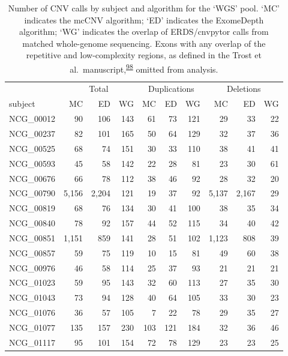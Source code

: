 \documentclass[11pt,letterpaper]{book}
\begin{document}
\begin{table}

\caption[Number of CNV calls by subject and algorithm for the 'WGS' pool.]{\label{tab:wgsCallSbj}Number of CNV calls by subject and algorithm for the `WGS' pool. `MC' indicates the mcCNV algorithm; `ED' indicates the ExomeDepth algorithm; `WG' indicates the overlap of ERDS/cnvpytor calls from matched whole-genome sequencing. Exons with any overlap of the repetitive and low-complexity regions, as defined in the Trost et al.~manuscript,\textsuperscript{\protect\hyperlink{ref-trost:2018aa}{98}} omitted from analysis.}
\centering
\begin{tabular}[t]{lrrrrrrrrr}
\toprule
\multicolumn{1}{c}{ } & \multicolumn{3}{c}{Total} & \multicolumn{3}{c}{Duplications} & \multicolumn{3}{c}{Deletions} \\
\cmidrule(l{3pt}r{3pt}){2-4} \cmidrule(l{3pt}r{3pt}){5-7} \cmidrule(l{3pt}r{3pt}){8-10}
subject & MC & ED & WG & MC & ED & WG & MC & ED & WG\\
\midrule
NCG\_00012 & 90 & 106 & 143 & 61 & 73 & 121 & 29 & 33 & 22\\
NCG\_00237 & 82 & 101 & 165 & 50 & 64 & 129 & 32 & 37 & 36\\
NCG\_00525 & 68 & 74 & 151 & 30 & 33 & 110 & 38 & 41 & 41\\
NCG\_00593 & 45 & 58 & 142 & 22 & 28 & 81 & 23 & 30 & 61\\
NCG\_00676 & 66 & 78 & 112 & 38 & 46 & 92 & 28 & 32 & 20\\
\addlinespace
NCG\_00790 & 5,156 & 2,204 & 121 & 19 & 37 & 92 & 5,137 & 2,167 & 29\\
NCG\_00819 & 68 & 76 & 134 & 30 & 41 & 100 & 38 & 35 & 34\\
NCG\_00840 & 78 & 92 & 157 & 44 & 52 & 115 & 34 & 40 & 42\\
NCG\_00851 & 1,151 & 859 & 141 & 28 & 51 & 102 & 1,123 & 808 & 39\\
NCG\_00857 & 59 & 75 & 119 & 10 & 15 & 81 & 49 & 60 & 38\\
\addlinespace
NCG\_00976 & 46 & 58 & 114 & 25 & 37 & 93 & 21 & 21 & 21\\
NCG\_01023 & 59 & 95 & 143 & 32 & 60 & 113 & 27 & 35 & 30\\
NCG\_01043 & 73 & 94 & 128 & 40 & 64 & 105 & 33 & 30 & 23\\
NCG\_01076 & 36 & 57 & 105 & 7 & 22 & 78 & 29 & 35 & 27\\
NCG\_01077 & 135 & 157 & 230 & 103 & 121 & 184 & 32 & 36 & 46\\
\addlinespace
NCG\_01117 & 95 & 101 & 154 & 72 & 78 & 129 & 23 & 23 & 25\\
\bottomrule
\end{tabular}
\end{table}
\end{document}
